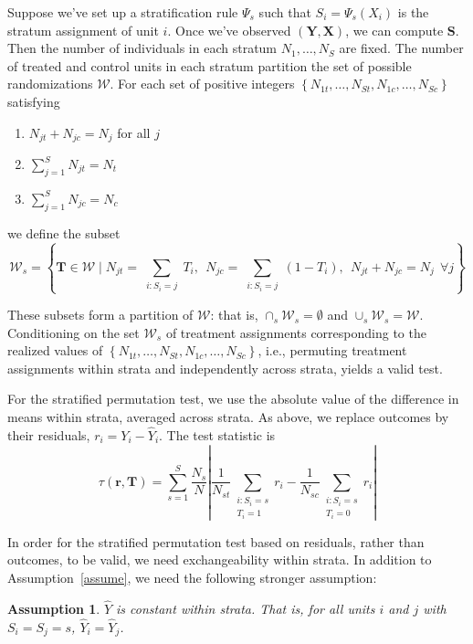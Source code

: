 \documentclass[12pt]{article}
\newtheorem{assumption}{Assumption}
\begin{document}
Suppose we've set up a stratification rule $\Psi_s$ such that $S_i = \Psi_s(X_i)$ is the stratum assignment of unit $i$.
Once we've observed $(\mathbf{Y}, \mathbf{X})$, we can compute $\mathbf{S}$.
Then the number of individuals in each stratum $N_1, \dots, N_S$ are fixed.
The number of treated and control units in each stratum partition the set of possible randomizations $\mathcal{W}$.
For each set of positive integers $\left\lbrace N_{1t}, \dots, N_{St}, N_{1c}, \dots, N_{Sc}\right\rbrace$ satisfying 
\begin{enumerate}
\item $N_{jt} + N_{jc} = N_j$ for all $j$ 
\item $\sum_{j=1}^S N_{jt} = N_t$
\item $\sum_{j=1}^S N_{jc} = N_c$
\end{enumerate}

we define the subset 
$$\mathcal{W}_s = \left\lbrace \mathbf{T} \in \mathcal{W} \mid N_{jt} = \sum_{\substack{i: S_i = j}} T_i, ~~ N_{jc} = \sum_{\substack{i: S_i = j}} (1-T_i), ~~ N_{jt} + N_{jc} = N_j ~~ \forall j \right\rbrace$$

These subsets form a partition of $\mathcal{W}$: that is, $\cap_s \mathcal{W}_s = \emptyset$ and $\cup_s \mathcal{W}_s = \mathcal{W}$.
Conditioning on the set $\mathcal{W}_s$ of treatment assignments corresponding to the realized values of $\left\lbrace N_{1t}, \dots, N_{St}, N_{1c}, \dots, N_{Sc}\right\rbrace$,
i.e., permuting treatment assignments within strata and independently across strata, yields a valid test.

For the stratified permutation test, we use the absolute value of the difference in means within strata, averaged across strata.
As above, we replace outcomes by their residuals, $r_i = Y_i - \hat{Y}_i$.
The test statistic is
$$\tau(\mathbf{r}, \mathbf{T}) =\sum_{s=1}^S  \frac{N_s}{N} \left\lvert \frac{1}{N_{st}} \sum_{\substack{i  : S_i = s\\T_i=1}} r_i - \frac{1}{N_{sc}} \sum_{\substack{i : S_i = s\\ T_i=0}} r_i \right\rvert$$

In order for the stratified permutation test based on residuals, rather than outcomes, to be valid, we need exchangeability within strata.
In addition to Assumption~\ref{assume}, we need the following stronger assumption:

\begin{assumption}\label{assume2}
$\hat{Y}$ is constant within strata. That is, for all units $i$ and $j$ with $S_i = S_j = s$, $\hat{Y}_i = \hat{Y}_j$.
\end{assumption}
\end{document}
